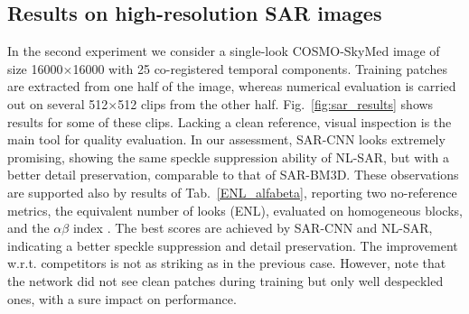\documentclass{article}
\begin{document}
\subsection{Results on high-resolution SAR images}

In the second experiment we consider a single-look COSMO-SkyMed image of size 16000$\times$16000 with 25 co-registered temporal components.
Training patches are extracted from one half of the image, whereas numerical evaluation is carried out on several 512$\times$512 clips from the other half.
Fig.~\ref{fig:sar_results} shows results for some of these clips.
Lacking a clean reference, visual inspection is the main tool for quality evaluation.
In our assessment, SAR-CNN looks extremely promising, showing the same speckle suppression ability of NL-SAR, but with a better detail preservation, comparable to that of SAR-BM3D.
These observations are supported also by results of Tab.~\ref{ENL_alfabeta}, reporting two no-reference metrics, the equivalent number of looks (ENL), evaluated on homogeneous blocks,
and the $\alpha\beta$ index \cite{Gomez2016}.
The best scores are achieved by SAR-CNN and NL-SAR, indicating a better speckle suppression and detail preservation.
The improvement w.r.t. competitors is not as striking as in the previous case.
However, note that the network did not see clean patches during training
but only well despeckled ones, with a sure impact on performance.


\end{document}
